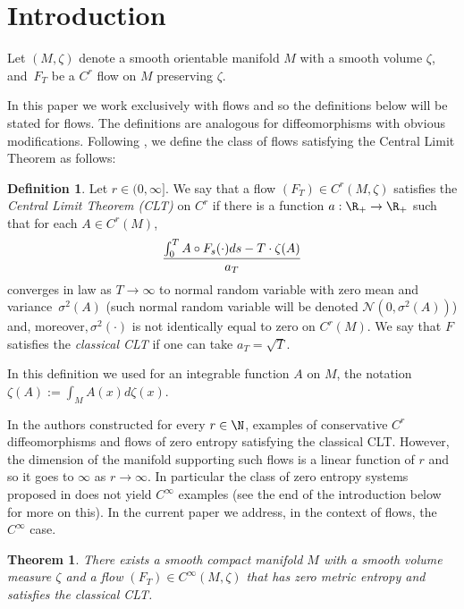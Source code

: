 \documentclass[JEP,XML,SOM,Unicode,NoFloatCountersInSection]{cedram}
\let\DS\relax
\newcommand\cN{\mathcal{N}}
\theoremstyle{definition}
\newtheorem{definition}{Definition}
\theoremstyle{plain}
\newtheorem{Main}{Theorem}
\begin{document}
\tableofcontents


\section{Introduction}

Let $(M,\zeta)$ denote a smooth orientable manifold $M$ with a smooth volume $\zeta$, and~$F_T$ be a $C^r$ flow on $M$ preserving $\zeta$.

In this paper we work exclusively with flows and so the definitions below will be stated for flows. The definitions are analogous for diffeomorphisms with obvious modifications. Following \cite{DDKN}, we define the class of flows satisfying the Central Limit Theorem as follows:

\begin{definition}
\label{DefCLT} Let $r\in (0,\infty]$. We say that a flow $(F_T)\in C^r(M,\zeta)$ satisfies the
\emph{Central Limit Theorem (CLT)} on $C^r$ if
there is a function $a:\R_+\to \R_+$ such that
for each $A \in C^r(M)$,
\[
\frac{\DS \int_{0}^{T}A\circ F_s(\cdot)ds-T\cdot \zeta(A)}{a_T}
\] converges in law as $T\to\infty$
to normal random variable with zero mean and variance~$\sigma^2(A)$
(such normal random variable will be denoted $\cN(0, \sigma^2(A))$) and, moreover$,\sigma^2(\cdot)$
is not identically equal to zero on $C^r(M)$.
We say that $F$ satisfies the \emph{classical CLT}
if one can take $a_T=\sqrt{T}$.
\end{definition}

In this definition we used for an integrable function $A$ on $M$, the notation $\zeta(A):=\int_M A(x)d\zeta(x)$.

In \cite{DDKN} the authors constructed for every $r\in \N$, examples of conservative $C^r$ diffeomorphisms and flows of zero entropy satisfying the classical CLT. However, the dimension of the manifold supporting such flows is a linear function of $r$ and so it goes to $\infty$ as $r\to \infty$. In particular the class of zero entropy systems proposed in \cite{DDKN} does not yield $C^\infty$ examples (see the end of the introduction below for more on this). In the current paper we address, in the context of flows, the $C^\infty$ case.

\begin{Main}\label{thm:main2}
There exists a smooth compact manifold $M$ with a smooth volume measure $\zeta$
and a flow $(F_T) \in C^\infty(M,\zeta)$ that has zero metric entropy and satisfies the classical CLT.
\end{Main}
\end{document}
